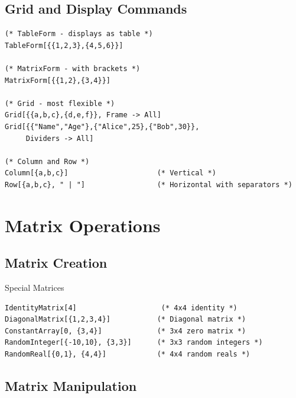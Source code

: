 \documentclass[12pt,a4paper]{article}
\begin{document}
\subsection{Grid and Display Commands}

\begin{commandbox}
\begin{lstlisting}
(* TableForm - displays as table *)
TableForm[{{1,2,3},{4,5,6}}]

(* MatrixForm - with brackets *)
MatrixForm[{{1,2},{3,4}}]

(* Grid - most flexible *)
Grid[{{a,b,c},{d,e,f}}, Frame -> All]
Grid[{{"Name","Age"},{"Alice",25},{"Bob",30}}, 
     Dividers -> All]

(* Column and Row *)
Column[{a,b,c}]                     (* Vertical *)
Row[{a,b,c}, " | "]                 (* Horizontal with separators *)
\end{lstlisting}
\end{commandbox}

\section{Matrix Operations}

\subsection{Matrix Creation}

\begin{mainbox}{Special Matrices}
\begin{lstlisting}
IdentityMatrix[4]                    (* 4x4 identity *)
DiagonalMatrix[{1,2,3,4}]           (* Diagonal matrix *)
ConstantArray[0, {3,4}]             (* 3x4 zero matrix *)
RandomInteger[{-10,10}, {3,3}]      (* 3x3 random integers *)
RandomReal[{0,1}, {4,4}]            (* 4x4 random reals *)
\end{lstlisting}
\end{mainbox}

\subsection{Matrix Manipulation}
\end{document}
